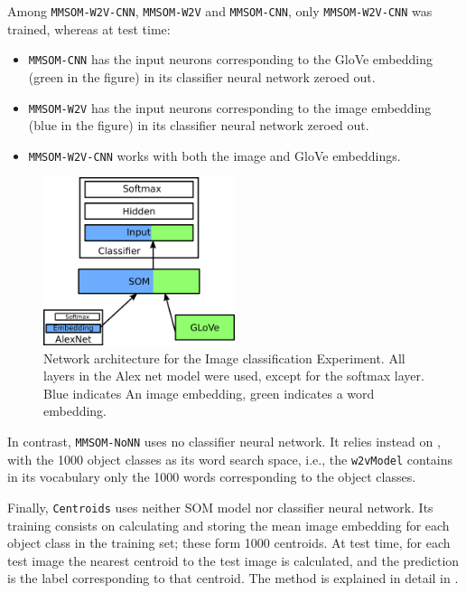 \documentclass[a4paper]{standalone}
\begin{document}
Among \verb|MMSOM-W2V-CNN|, \verb|MMSOM-W2V| and \verb|MMSOM-CNN|, only \verb|MMSOM-W2V-CNN| was trained, whereas at test time:
\begin{itemize}
    \item \verb|MMSOM-CNN| has the input neurons corresponding to the GloVe embedding (green in the figure) in its classifier neural network zeroed out.
    \item \verb|MMSOM-W2V| has the input neurons corresponding to the image embedding (blue in the figure) in its classifier neural network zeroed out.
    \item \verb|MMSOM-W2V-CNN| works with both the image and GloVe embeddings.
\end{itemize}

\begin{figure}[h]
    \centering
    \includegraphics[width=0.5\textwidth]{images/ImageNetExperimentArchitecture.png}
    \caption{Network architecture for the Image classification Experiment. All layers in the Alex net model were used, except for the softmax layer. Blue indicates An image embedding, green indicates a word embedding.}\label{fig:ImageNetExperimentArchitecture}
\end{figure}

In contrast, \verb|MMSOM-NoNN| uses no classifier neural network. It relies instead on , with the 1000 object classes as its word search space, i.e., the \verb|w2vModel| contains in its vocabulary only the 1000 words corresponding to the object classes.

Finally, \verb|Centroids| uses neither SOM model nor classifier neural network. Its training consists on calculating and storing the mean image embedding for each object class in the training set; these form 1000 centroids. At test time, for each test image the nearest centroid to the test image is calculated, and the prediction is the label corresponding to that centroid. The method is explained in detail in .
\end{document}
